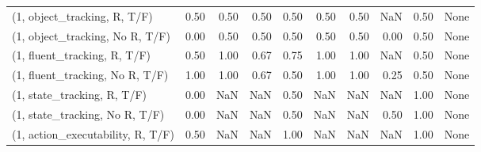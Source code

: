 \begin{table*}[h!]
\begin{adjustbox}{width=2\columnwidth,center}
\begin{tabular}{lrrr|rrr|rrr}
\midrule
(1, object\_tracking, R, T/F)         &                      0.50 &                  0.50 &                      0.50 &                          0.50 &                      0.50 &                          0.50 &                                    NaN &                               0.50 &                                  None \\
(1, object\_tracking, No R, T/F)      &                      0.00 &                  0.50 &                      0.50 &                          0.50 &                      0.50 &                          0.50 &                                   0.00 &                               0.50 &                                  None \\
(1, fluent\_tracking, R, T/F)         &                      0.50 &                  1.00 &                      0.67 &                          0.75 &                      1.00 &                          1.00 &                                    NaN &                               0.50 &                                  None \\
(1, fluent\_tracking, No R, T/F)      &                      1.00 &                  1.00 &                      0.67 &                          0.50 &                      1.00 &                          1.00 &                                   0.25 &                               0.50 &                                  None \\
(1, state\_tracking, R, T/F)          &                      0.00 &                   NaN &                       NaN &                          0.50 &                       NaN &                           NaN &                                    NaN &                               1.00 &                                  None \\
(1, state\_tracking, No R, T/F)       &                      0.00 &                   NaN &                       NaN &                          0.50 &                       NaN &                           NaN &                                   0.50 &                               1.00 &                                  None \\
(1, action\_executability, R, T/F)    &                      0.50 &                   NaN &                       NaN &                          1.00 &                       NaN &                           NaN &                                    NaN &                               1.00 &                                  None \\

\end{tabular}
\end{adjustbox}
\end{table*}
